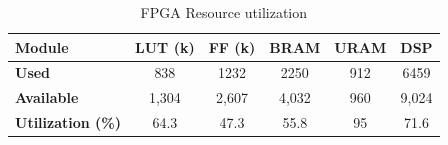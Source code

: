 \documentclass[conference]{IEEEtran}
\begin{document}
\begin{table}[t]
\centering
\caption{FPGA Resource utilization}
\label{tab:resource_breakdown}
\begin{tabular}{lccccc}
\toprule
\textbf{Module} & \textbf{LUT (k)} & \textbf{FF (k)} & \textbf{BRAM} & \textbf{URAM} & \textbf{DSP} \\
\midrule
\textbf{Used} & 838 & 1232 & 2250 & 912 & 6459 \\
\textbf{Available} & 1,304 & 2,607 & 4,032 & 960 & 9,024 \\
\textbf{Utilization (\%)} & 64.3 & 47.3 & 55.8 & 95 & 71.6 \\
\bottomrule
\end{tabular}
\end{table}
\end{document}
